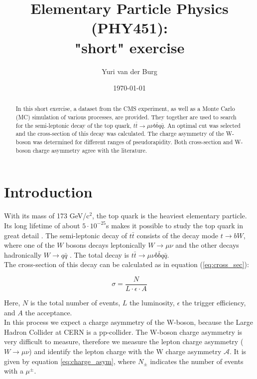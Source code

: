 \documentclass[%
 reprint,
 amsmath,amssymb,
 aps,
]{revtex4-2}
\begin{document}

\title{Elementary Particle Physics (PHY451): \\ "short" exercise}

\author{Yuri van der Burg}

\date{\today}

\begin{abstract}
In this short exercise, a dataset from the CMS experiment, as well as a Monte Carlo (MC) simulation of various processes, are provided. They together are used to search for the semi-leptonic decay of the top quark, $t \bar t \rightarrow \mu \nu b \bar b q \bar q$. An optimal cut was selected and the cross-section of this decay was calculated. The charge asymmetry of the W-boson was determined for different ranges of pseudorapidity. Both cross-section and W-boson charge asymmetry agree with the literature. 
\end{abstract}
\maketitle


\section{\label{sec:introduction}Introduction}
With its mass of 173 GeV/c$^2$, the top quark is the heaviest elementary particle. Its long lifetime of about $5 \cdot 10^{-25}$s makes it possible to study the top quark in great detail \cite{workman_review_2022}.
The semi-leptonic decay of $t \bar t$ consists of the decay mode $t \rightarrow bW$, where one of the $W$ bosons decays leptonically $W \rightarrow \mu \nu$ and the other decays hadronically $W \rightarrow q \bar q$ \cite{cms_collaboration_measurement_2018}. The total decay is $t \bar t \rightarrow \mu \nu b \bar b q \bar q$. \\
The cross-section of this decay can be calculated as in equation (\ref{eq:cross_sec}):

\begin{equation}\label{eq:cross_sec}
    \sigma = \frac{N}{L \cdot \epsilon \cdot A}
\end{equation}

Here, $N$ is the total number of events, $L$ the luminosity, $\epsilon$ the trigger efficiency, and $A$ the acceptance. \\
In this process we expect a charge asymmetry of the W-boson, because the Large Hadron Collider at CERN is a pp-collider. The W-boson charge asymmetry is very difficult to measure, therefore we measure the lepton charge asymmetry ($W \rightarrow \mu \nu$) and identify the lepton charge with the W charge asymmetry $\mathcal{A}$. It is given by equation \ref{eq:charge_asym}, where $N_{\pm}$ indicates the number of events with a $\mu^{\pm}$. 
\end{document}
